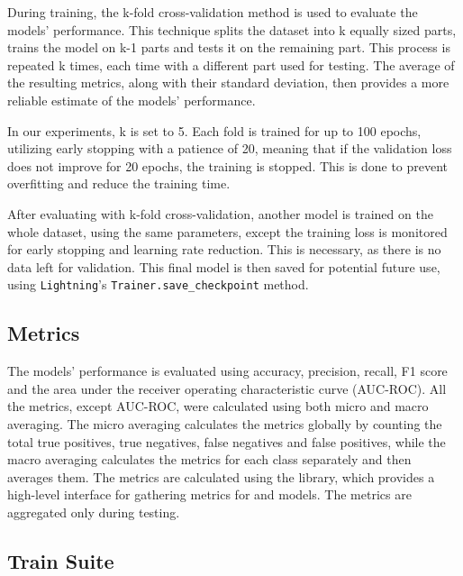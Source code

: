 \documentclass[english, he, bc, kiv, iso690alph, viewonly]{fasthesis}
\begin{document}
During training, the k-fold cross-validation method is used to evaluate the models' performance. This technique splits the dataset into k equally sized parts, trains the model on k-1 parts and tests it on the remaining part. This process is repeated k times, each time with a different part used for testing. The average of the resulting metrics, along with their standard deviation, then provides a more reliable estimate of the models' performance.

In our experiments, k is set to 5. Each fold is trained for up to 100 epochs, utilizing early stopping with a patience of 20, meaning that if the validation loss does not improve for 20 epochs, the training is stopped. This is done to prevent overfitting and reduce the training time.

After evaluating with k-fold cross-validation, another model is trained on the whole dataset, using the same parameters, except the training loss is monitored for early stopping and learning rate reduction. This is necessary, as there is no data left for validation. This final model is then saved for potential future use, using \texttt{Lightning}'s \texttt{Trainer.save\_checkpoint} method.

\subsection{Metrics}

The models' performance is evaluated using accuracy, precision, recall, F1 score and the area under the receiver operating characteristic curve (AUC-ROC). All the metrics, except AUC-ROC, were calculated using both micro and macro averaging. The micro averaging calculates the metrics globally by counting the total true positives, true negatives, false negatives and false positives, while the macro averaging calculates the metrics for each class separately and then averages them.
The metrics are calculated using the  library, which provides a high-level interface for gathering metrics for  and  models. The metrics are aggregated only during testing.

\subsection{Train Suite}
\end{document}
